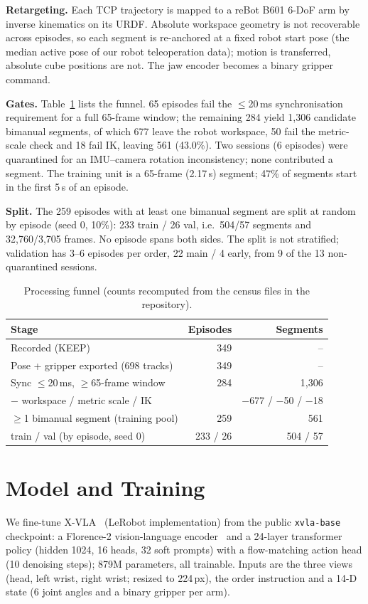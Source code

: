 \documentclass[conference,10pt]{IEEEtran}
\begin{document}
\textbf{Retargeting.} Each TCP trajectory is mapped to a reBot B601 6-DoF arm by inverse kinematics on its URDF. Absolute
workspace geometry is not recoverable across episodes, so each segment is re-anchored at a fixed robot start pose (the median
active pose of our robot teleoperation data); motion is transferred, absolute cube positions are not. The jaw encoder becomes a
binary gripper command.

\textbf{Gates.} Table~\ref{p1:tab:funnel} lists the funnel. 65 episodes fail the $\le$20\,ms synchronisation requirement for a full
65-frame window; the remaining 284 yield 1{,}306 candidate bimanual segments, of which 677 leave the robot workspace, 50 fail the
metric-scale check and 18 fail IK, leaving 561 (43.0\%). Two sessions (6 episodes) were quarantined for an IMU--camera
rotation inconsistency; none contributed a segment. The training unit is a 65-frame (2.17\,s) segment; 47\% of segments start
in the first 5\,s of an episode.

\textbf{Split.} The 259 episodes with at least one bimanual segment are split at random by episode (seed 0, 10\%): 233 train /
26 val, i.e.\ 504/57 segments and 32{,}760/3{,}705 frames. No episode spans both sides. The split is not stratified; validation
has 3--6 episodes per order, 22 main / 4 early, from 9 of the 13 non-quarantined sessions.

\begin{table}[t]
\centering\footnotesize
\caption{Processing funnel (counts recomputed from the census files in the repository).}
\label{p1:tab:funnel}
\setlength{\tabcolsep}{4pt}\begin{tabular}{@{}lrr@{}}
\toprule
Stage & Episodes & Segments \\
\midrule
Recorded (KEEP) & 349 & -- \\
Pose + gripper exported (698 tracks) & 349 & -- \\
Sync $\le$20\,ms, $\ge$65-frame window & 284 & 1{,}306 \\
\quad $-$ workspace / metric scale / IK & & $-$677 / $-$50 / $-$18 \\
$\ge$1 bimanual segment (training pool) & 259 & 561 \\
\quad train / val (by episode, seed 0) & 233 / 26 & 504 / 57 \\
\bottomrule
\end{tabular}
\end{table}

\section{Model and Training}\label{p1:sec:model}
We fine-tune X-VLA~\cite{zheng2025xvla} (LeRobot implementation) from the public \texttt{xvla-base} checkpoint: a Florence-2
vision-language encoder~\cite{xiao2024florence2} and a 24-layer transformer policy (hidden 1024, 16 heads, 32 soft prompts) with a
flow-matching action head (10 denoising steps); 879M parameters, all trainable. Inputs are the three views (head, left wrist,
right wrist; resized to 224\,px), the order instruction and a 14-D state (6 joint angles and a binary gripper per arm).
\end{document}
